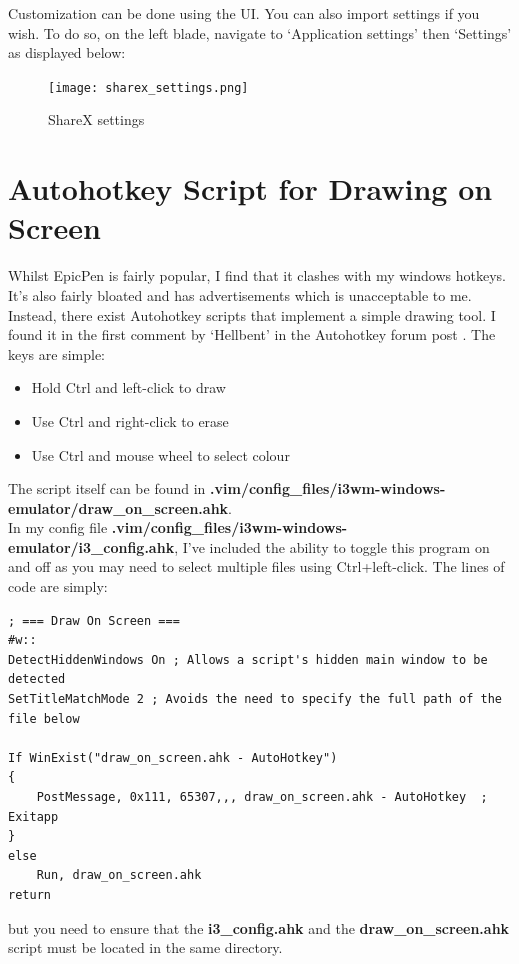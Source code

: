 Customization can be done using the UI. You can also import settings if you
wish. To do so, on the left blade, navigate to `Application settings' then
`Settings' as displayed below:
\begin{figure}[H]
    \centering
    \texttt{[image: sharex\_settings.png]}
    \caption{ShareX settings}
    \label{FigShareXSetting}
\end{figure}

\section{Autohotkey Script for Drawing on Screen}
Whilst EpicPen is fairly popular, I find that it clashes with my windows
hotkeys. It's also fairly bloated and has advertisements which is unacceptable
to me. Instead, there exist Autohotkey scripts that implement a simple drawing
tool. I found it in the first comment by `Hellbent' in the Autohotkey forum post
\cite{hellbent2019draw}. The keys are simple:
\begin{itemize}
    \item Hold Ctrl and left-click to draw
    \item Use Ctrl and right-click to erase
    \item Use Ctrl and mouse wheel to select colour
\end{itemize}
The script itself can be found in
\textbf{.vim/config\_files/i3wm-windows-emulator/draw\_on\_screen.ahk}.\\

In my config file
\textbf{.vim/config\_files/i3wm-windows-emulator/i3\_config.ahk}, I've included
the ability to toggle this program on and off as you may need to select multiple
files using Ctrl+left-click. The lines of code are simply:
\begin{lstlisting}
; === Draw On Screen ===
#w::
DetectHiddenWindows On ; Allows a script's hidden main window to be detected
SetTitleMatchMode 2 ; Avoids the need to specify the full path of the file below

If WinExist("draw_on_screen.ahk - AutoHotkey")
{
	PostMessage, 0x111, 65307,,, draw_on_screen.ahk - AutoHotkey  ; Exitapp
}
else
	Run, draw_on_screen.ahk
return
\end{lstlisting}
but you need to ensure that the \textbf{i3\_config.ahk} and the
\textbf{draw\_on\_screen.ahk} script must be located in the same directory.
